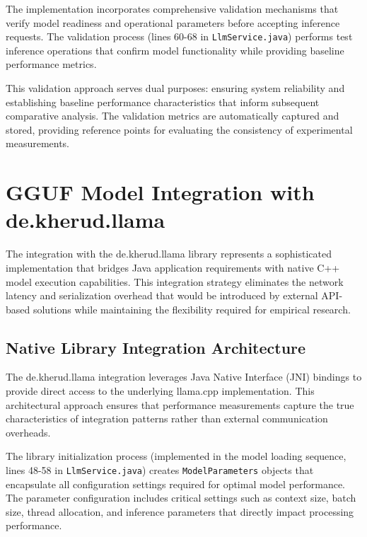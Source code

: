 The implementation incorporates comprehensive validation mechanisms that verify model readiness and operational parameters before accepting inference requests. The validation process (lines 60-68 in \texttt{LlmService.java}) performs test inference operations that confirm model functionality while providing baseline performance metrics.


This validation approach serves dual purposes: ensuring system reliability and establishing baseline performance characteristics that inform subsequent comparative analysis. The validation metrics are automatically captured and stored, providing reference points for evaluating the consistency of experimental measurements.


\section{GGUF Model Integration with de.kherud.llama}

The integration with the de.kherud.llama library represents a sophisticated implementation that bridges Java application requirements with native C++ model execution capabilities. This integration strategy eliminates the network latency and serialization overhead that would be introduced by external API-based solutions while maintaining the flexibility required for empirical research.

\subsection{Native Library Integration Architecture}

The de.kherud.llama integration leverages Java Native Interface (JNI) bindings to provide direct access to the underlying llama.cpp implementation. This architectural approach ensures that performance measurements capture the true characteristics of integration patterns rather than external communication overheads.

The library initialization process (implemented in the model loading sequence, lines 48-58 in \texttt{LlmService.java}) creates \texttt{ModelParameters} objects that encapsulate all configuration settings required for optimal model performance. The parameter configuration includes critical settings such as context size, batch size, thread allocation, and inference parameters that directly impact processing performance.

